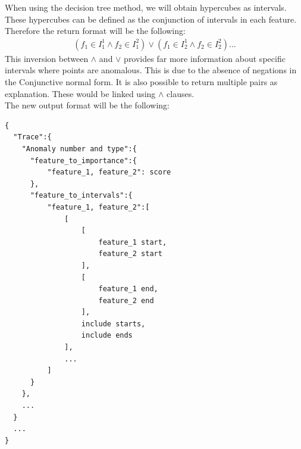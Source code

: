 \documentclass[oneside, a4paper, onecolumn, 11pt]{article}
\begin{document}
When using the decision tree method, we will obtain hypercubes as intervals. These hypercubes can be defined as the conjunction of intervals in each feature. Therefore the return format will be the following: 
\begin{align*}
  (f_1 \in I^1_1 \land f_2 \in I^2_1) \lor (f_1 \in I^1_2 \land f_2 \in I^2_2) ...
\end{align*}
This inversion between $\land$ and $\lor$ provides far more information about specific intervals where points are anomalous. This is due to the absence of negations in the Conjunctive normal form. It is also possible to return multiple pairs as explanation. These would be linked using $\land$ clauses.\\
The new output format will be the following:
\begin{verbatim}
{
  "Trace":{
    "Anomaly number and type":{
      "feature_to_importance":{
          "feature_1, feature_2": score
      },
      "feature_to_intervals":{
          "feature_1, feature_2":[
              [
                  [
                      feature_1 start,
                      feature_2 start
                  ],
                  [
                      feature_1 end,
                      feature_2 end
                  ],
                  include starts,
                  include ends
              ],
              ...
          ]
      }
    },
    ...
  }
  ...
}
\end{verbatim}
\end{document}
